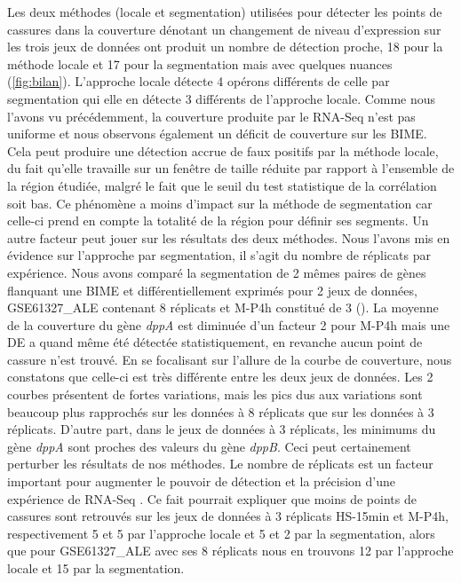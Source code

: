 \documentclass[12pt,a4paper]{report}
\begin{document}
\begin{onehalfspace}
Les deux méthodes (locale et segmentation) utilisées pour détecter les points de cassures dans la couverture dénotant un changement de niveau d'expression sur les trois jeux de données ont produit un nombre de détection proche, 18 pour la méthode locale et 17 pour la segmentation mais avec quelques nuances (\autoref{fig:bilan}). L'approche locale détecte 4 opérons différents de celle par segmentation qui elle en détecte 3 différents de l'approche locale. Comme nous l'avons vu précédemment, la couverture produite par le RNA-Seq n'est pas uniforme et nous observons également un déficit de couverture sur les BIME. Cela peut produire une détection accrue de faux positifs par la méthode locale, du fait qu'elle travaille sur un fenêtre de taille réduite par rapport à l'ensemble de la région étudiée, malgré le fait que le seuil du test statistique de la corrélation soit bas. Ce phénomène a moins d'impact sur la méthode de segmentation car celle-ci prend en compte la totalité de la région pour définir ses segments. Un autre facteur peut jouer sur les résultats des deux méthodes. Nous l'avons mis en évidence sur l'approche par segmentation, il s'agit du nombre de réplicats par expérience. Nous avons comparé la segmentation de 2 mêmes paires de gènes flanquant une BIME et différentiellement exprimés pour 2 jeux de données, GSE61327\_ALE contenant 8 réplicats et M-P4h constitué de 3 (). La moyenne de la couverture du gène \textit{dppA} est diminuée d'un facteur 2 pour M-P4h mais une DE a quand même été détectée statistiquement, en revanche aucun point de cassure n'est trouvé. En se focalisant sur l'allure de la courbe de couverture, nous constatons que celle-ci est très différente entre les deux jeux de données. Les 2 courbes présentent de fortes variations, mais les pics dus aux variations sont beaucoup plus rapprochés sur les données à 8 réplicats que sur les données à 3 réplicats. D'autre part, dans le jeux de données à 3 réplicats, les minimums du gène \textit{dppA} sont proches des valeurs du gène \textit{dppB}. Ceci peut certainement perturber les résultats de nos méthodes. Le nombre de réplicats est un facteur important pour augmenter le pouvoir de détection et la précision  d'une expérience de RNA-Seq \citep{Liu2014}. Ce fait pourrait expliquer que moins de points de cassures sont retrouvés sur les jeux de données à 3 réplicats HS-15min et M-P4h, respectivement 5 et 5 par l'approche locale et 5 et 2 par la segmentation, alors que pour GSE61327\_ALE avec ses 8 réplicats nous en trouvons 12 par l'approche locale et 15 par la segmentation.


\end{onehalfspace}
\end{document}
